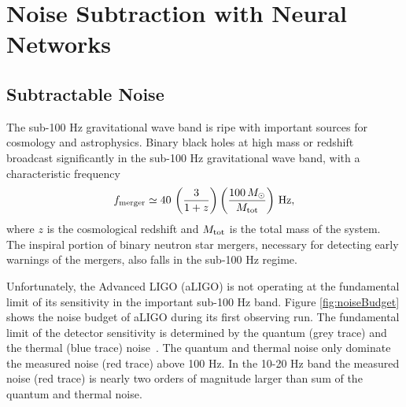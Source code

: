\chapter{Noise Subtraction with Neural Networks}
\label{chap:nohair}

\begin{refsection}

\section{Subtractable Noise}

The sub-100 Hz gravitational wave band is ripe with important sources for cosmology and astrophysics. Binary black holes at high mass or redshift broadcast significantly in the sub-100 Hz gravitational wave band, with a characteristic frequency
\begin{equation}
f_{\rm merger} \simeq 40\,\left(\frac{3}{1+z}\right)\left(\frac{100\,M_\odot}{M_{\rm tot}}\right)\,{\rm Hz},
\end{equation}
where $z$ is the cosmological redshift and $M_{\rm tot}$ is the total mass of the system. The inspiral portion of binary neutron star mergers, necessary for detecting early warnings of the mergers, also falls in the sub-100 Hz regime. 

Unfortunately, the Advanced LIGO (aLIGO) is not operating at the fundamental limit of its sensitivity in the important sub-100 Hz band. Figure 
\ref{fig:noiseBudget} 
shows the noise budget of aLIGO during its first observing run. The fundamental limit of the detector sensitivity is determined by the quantum (grey trace) and the thermal (blue trace) noise~\cite{Martynov:16}. The quantum and thermal noise only dominate the measured noise (red trace) above 100 Hz. In the 10-20 Hz band the measured noise (red trace) is nearly two orders of magnitude larger than sum of the quantum and thermal noise.


\end{refsection}
